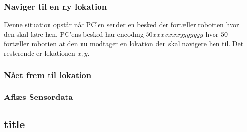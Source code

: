\subsubsection{Naviger til en ny lokation}
Denne situation opstår når PC'en sender en besked der fortæller robotten hvor den skal køre hen.
PC'ens besked har encoding $50xxxxxxxyyyyyyy$ hvor $50$ fortæller robotten at den nu modtager en lokation den skal navigere hen til.
Det resterende er lokationen $x,y$.

\subsubsection{Nået frem til lokation}

\subsubsection{Aflæs Sensordata}



\subsection{title}